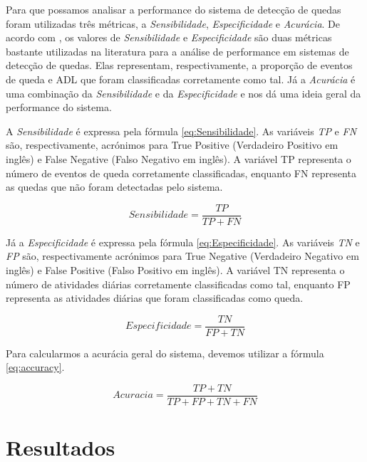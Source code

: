 Para que possamos analisar a performance do sistema de detecção de quedas foram utilizadas três métricas, a \textit{Sensibilidade},  \textit{Especificidade} e \textit{Acurácia}. De acordo com \cite{casilari2015automatic}, os valores de \textit{Sensibilidade} e \textit{Especificidade} são duas métricas bastante utilizadas na literatura para a análise de performance em sistemas de detecção de quedas. Elas representam, respectivamente, a proporção de eventos de queda e \ac{ADL} que foram classificadas corretamente como tal. Já a \textit{Acurácia} é uma combinação da \textit{Sensibilidade} e da \textit{Especificidade} e nos dá uma ideia geral da performance do sistema.

A \textit{Sensibilidade} é expressa pela fórmula \ref{eq:Sensibilidade}. As variáveis \textit{TP} e \textit{FN} são, respectivamente, acrónimos para True Positive (Verdadeiro Positivo em inglês) e False Negative (Falso Negativo em inglês). A variável TP representa o número de eventos de queda corretamente classificadas, enquanto FN representa as quedas que não foram detectadas pelo sistema.

\begin{equation}
Sensibilidade = \frac{TP}{TP + FN}
\label{eq:Sensibilidade}
\end{equation}


Já a \textit{Especificidade} é expressa pela fórmula \ref{eq:Especificidade}. As variáveis \textit{TN} e \textit{FP} são, respectivamente acrónimos para True Negative (Verdadeiro Negativo em inglês) e False Positive (Falso Positivo em inglês). A variável TN representa o número de atividades diárias corretamente classificadas como tal, enquanto FP representa as atividades diárias que foram classificadas como queda.

\begin{equation}
Especificidade = \frac{TN}{FP + TN}
\label{eq:Especificidade}
\end{equation}

Para calcularmos a acurácia geral do sistema, devemos utilizar a fórmula \ref{eq:accuracy}. 

\begin{equation}
Acuracia = \frac{TP + TN}{TP + FP + TN + FN}
\label{eq:accuracy}
\end{equation}


\section{Resultados}
\label{sec:results}


